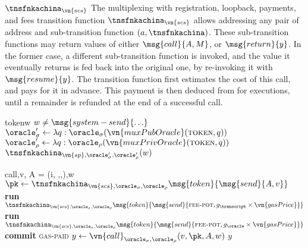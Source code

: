 \begin{transitionfn}{$\tnsfnkachina_{\vn{scs}}$}
  \sloppy
  The multiplexing with registration, loopback, payments, and fees transition
  function $\tnsfnkachina_{\vn{scs}}$ allows addressing any pair of address and
  sub-transition function $(a, \tnsfnkachina)$. These sub-transition functions may
  return values of either $\msg{call}{A, M}$, or $\msg{return}{y}$. In the
  former case, a different sub-transition function is invoked, and the value it
  eventually returns is fed back into the original one, by re-invoking it with
  $\msg{resume}{y}$. The transition function first estimates the cost of
    this call, and pays for it in advance. This payment is then deduced from for
  executions, until a remainder is refunded at the end of a successful call.

  \fussy
  \begin{pubstatedecl}
  \end{pubstatedecl}%
  \vspace{-1em}
  \begin{privstatedecl}
  \end{privstatedecl}

  \begin{receiveinput}{token}{w}
    \State \Assert $w \neq \msg{system-send}{\ldots}$
    \State \Let $\oracle_\sigma' \gets \lambda q :
      \oracle_\sigma(\vn{muxPubOracle}(\textsc{token}, q))$
    \State \Let $\oracle_\rho' \gets \lambda q :
      \oracle_\rho(\vn{muxPrivOracle}(\textsc{token}, q))$
    \State \Return $\tnsfnkachina_{\vn{sp},\oracle_\sigma', \oracle_\rho'}(w)$
  \end{receiveinput}

  \begin{receiveinput}{call}{,\allowbreak v, A = (i, \tnsfnkachina,\allowbreak {},\allowbreak {}),\allowbreak w}
    \State \Let $\pk \gets \tnsfnkachina_{\vn{scs},\oracle_\sigma,\oracle_\rho}\msg{token}{\msg{send}{A, v}}$
    \mkpriv
    \mknorm
    \State \textbf{run} $\tnsfnkachina_{\vn{scs},\oracle_\sigma,\oracle_\rho}\msg{token}{\msg{send}{\textsc{fee-pot},
        g_\transcript \times \vn{gasPrice}}}$
    \State \textbf{run} $\tnsfnkachina_{\vn{scs},\oracle_\sigma,\oracle_\rho}\msg{token}{\msg{send}{\textsc{fee-pot},
        g_\oracle \times \vn{gasPrice}}}$
    \State \textbf{commit} \textsc{gas-paid}
    \mkpub
    \State {}
    \mknorm
    \State \Let $y \gets \vn{call}_{\oracle_\sigma,\oracle_\rho}(v, \pk, A, w)$
    \mkpub
    \State {}
    \mknorm
    \State \Return $y$
  \end{receiveinput}


\end{transitionfn}
